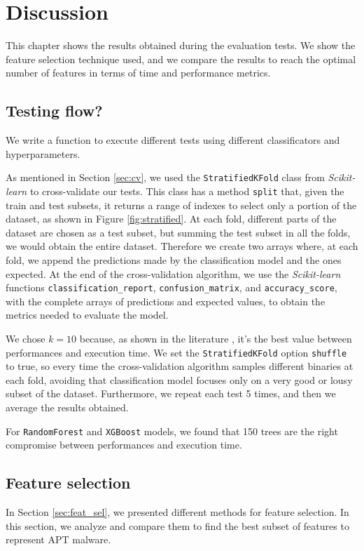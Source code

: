 \chapter{Discussion}
\label{ch:disc}

This chapter shows the results obtained during the evaluation tests. We show the feature selection technique used, and we compare the results to reach the optimal number of features in terms of time and performance metrics.

\section{Testing flow?}
\label{sec:flow}

We write a function to execute different tests using different classificators and hyperparameters. 

As mentioned in Section \ref{sec:cv}, we used the \texttt{StratifiedKFold} class from \textit{Scikit-learn} to cross-validate our tests. This class has a method \texttt{split} that, given the train and test subsets, it returns a range of indexes to select only a portion of the dataset, as shown in Figure \ref{fig:stratified}.  At each fold, different parts of the dataset are chosen as a test subset, but summing the test subset in all the folds, we would obtain the entire dataset. Therefore we create two arrays where, at each fold, we append the predictions made by the classification model and the ones expected. At the end of the cross-validation algorithm, we use the \textit{Scikit-learn} functions \texttt{classification\_report}, \texttt{confusion\_matrix}, and \texttt{accuracy\_score}, with the complete arrays of predictions and expected values, to obtain the metrics needed to evaluate the model.

We chose $k = 10$ because, as shown in the literature \cite{kohavi1995study}, it's the best value between performances and execution time. 
We set the \texttt{StratifiedKFold} option \texttt{shuffle} to true, so every time the cross-validation algorithm samples different binaries at each fold, avoiding that classification model focuses only on a very good or lousy subset of the dataset. Furthermore, we repeat each test 5 times, and then we average the results obtained.

For \texttt{RandomForest} and \texttt{XGBoost} models, we found that 150 trees are the right compromise between performances and execution time.

\section{Feature selection}
In Section \ref{sec:feat_sel}, we presented different methods for feature selection. In this section, we analyze and compare them to find the best subset of features to represent APT malware.

